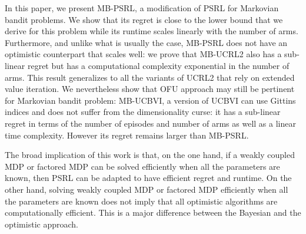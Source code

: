 In this paper, we present MB-PSRL, a modification of PSRL for Markovian bandit problems. We show that its regret is close to the lower bound that we derive for this problem while its runtime scales linearly with the number of arms. Furthermore, and unlike what is usually the case, MB-PSRL does not have an optimistic counterpart that scales well: we prove that  MB-UCRL2 also has a sub-linear regret but has a computational complexity exponential in the number of arms. This result generalizes to all  the variants of UCRL2 that rely on extended value iteration. We nevertheless show that OFU approach may still be pertinent for Markovian bandit problem:  MB-UCBVI, a version of UCBVI can use Gittins indices and  does not suffer from the dimensionality curse: it has a sub-linear regret in terms of the number of episodes and number of arms as well as a linear time complexity. However its regret remains larger than MB-PSRL.

The broad implication of this work is that, on the one hand, if a weakly coupled MDP or factored MDP can be solved efficiently when all the parameters are known, then PSRL can be adapted to have efficient regret and runtime. On the other hand, solving weakly coupled MDP or factored MDP efficiently when all the parameters are known does not imply that all optimistic algorithms are computationally efficient. This is a major difference between the Bayesian and the optimistic approach.




\endgroup
